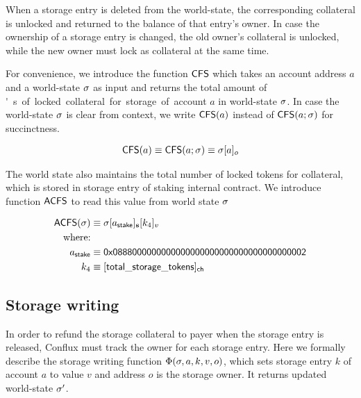 When a storage entry is deleted from the world-state, the corresponding \sunitprice collateral is unlocked and returned to the balance of that entry's owner.
In case the ownership of a storage entry is changed, 
the old owner's \sunitprice collateral is unlocked,
while the new owner must lock \sunitprice as collateral at the same time.

For convenience, we introduce the function $\mathsf{CFS}$ which takes an account address $a$ and a world-state $\mathbf{\sigma}$ as input and returns the total amount of \unit's of locked collateral for storage of account $a$ in world-state $\mathbf{\sigma}$.
In case the world-state $\mathbf{\sigma}$ is clear from context, we write $\mathsf{CFS}(a)$ instead of $\mathsf{CFS}(a;\mathbf{\sigma})$ for succinctness.

\begin{align}
	\mathsf{CFS}(a) \equiv \mathsf{CFS}(a;\mathbf{\sigma}) \equiv \mathbf{\sigma}[a]_o
\end{align}

The world state also maintains the total number of locked tokens for collateral, which is stored in storage entry of staking internal contract. We introduce function ${\sf ACFS}$ to read this value from world state $\mathbf{\sigma}$

\begin{align}
	\mathsf{ACFS}(\st) &\eqdef \st[a_{\sf stake}]_{\bf s}[k_4]_v\\
	\mbox{where:} & \\
	a_{\sf stake} &\eqdef \stakingcontract \\ 
	k_4 &\eqdef {\sf [total\char`_storage\char`_tokens]_{\sf ch}} 
\end{align}

\subsection{Storage writing}\label{sec:storage_maintain}

In order to refund the storage collateral to payer when the storage entry is released, Conflux must track the owner for each storage entry. Here we formally describe the storage writing function $\Phi(\mathbf{\sigma},a,k,v,o)$, which sets storage entry $k$ of account $a$ to value $v$ and address $o$ is the storage owner. It returns updated world-state $\mathbf{\sigma}'$. 

